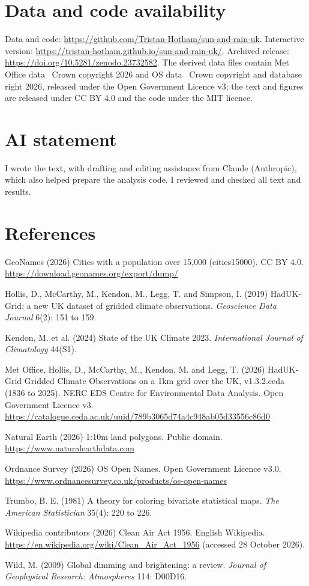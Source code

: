 \documentclass[11pt,a4paper]{article}
\begin{document}
\section*{Data and code availability}

Data and code: \url{https://github.com/Tristan-Hotham/sun-and-rain-uk}. Interactive version: \url{https://tristan-hotham.github.io/sun-and-rain-uk/}. Archived release: \url{https://doi.org/10.5281/zenodo.23732582}. The derived data files contain Met Office data \textcopyright\ Crown copyright 2026 and OS data \textcopyright\ Crown copyright and database right 2026, released under the Open Government Licence v3; the text and figures are released under CC BY 4.0 and the code under the MIT licence.

\section*{AI statement}

I wrote the text, with drafting and editing assistance from Claude (Anthropic), which also helped prepare the analysis code. I reviewed and checked all text and results.

\section*{References}
\small
GeoNames (2026) Cities with a population over 15,000 (cities15000). CC BY 4.0. \url{https://download.geonames.org/export/dump/}

Hollis, D., McCarthy, M., Kendon, M., Legg, T. and Simpson, I. (2019) HadUK-Grid: a new UK dataset of gridded climate observations. \emph{Geoscience Data Journal} 6(2): 151 to 159.

Kendon, M. et al. (2024) State of the UK Climate 2023. \emph{International Journal of Climatology} 44(S1).

Met Office, Hollis, D., McCarthy, M., Kendon, M. and Legg, T. (2026) HadUK-Grid Gridded Climate Observations on a 1km grid over the UK, v1.3.2.ceda (1836 to 2025). NERC EDS Centre for Environmental Data Analysis. Open Government Licence v3. \url{https://catalogue.ceda.ac.uk/uuid/789b3065d74a4c948ab05d33556c86d0}

Natural Earth (2026) 1:10m land polygons. Public domain. \url{https://www.naturalearthdata.com}

Ordnance Survey (2026) OS Open Names. Open Government Licence v3.0. \url{https://www.ordnancesurvey.co.uk/products/os-open-names}

Trumbo, B. E. (1981) A theory for coloring bivariate statistical maps. \emph{The American Statistician} 35(4): 220 to 226.

Wikipedia contributors (2026) Clean Air Act 1956. English Wikipedia. \url{https://en.wikipedia.org/wiki/Clean_Air_Act_1956} (accessed 28 October 2026).

Wild, M. (2009) Global dimming and brightening: a review. \emph{Journal of Geophysical Research: Atmospheres} 114: D00D16.
\end{document}
